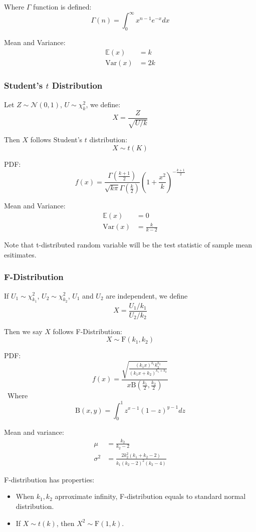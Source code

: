 Where $\Gamma$ function is defined:
\[
    \Gamma(n) = \int_0^\infty x^{n-1}e^{-x} dx
\]


Mean and Variance:
\[
\begin{aligned}
    \mathbb{E}(x) &= k \\
    \mathrm{Var}(x) &= 2k
\end{aligned}    
\]

\subsubsection{Student’s $t$ Distribution}
Let $Z \sim \mathcal{N}(0,1)$, $U \sim \chi_k^2$, we define:
\[
    X = \frac{Z}{\sqrt{U/k}}
\]

Then $X$ follows Student’s $t$ distribution:
\[
    X \sim t(K)
\]

PDF:
\[
    f(x) = \frac{\Gamma(\frac{k+1}{2})}{\sqrt{k\pi}\Gamma(\frac{k}{2})} (1+\frac{x^2}{k})^{-\frac{k+1}{2}}
\]

Mean and Variance:
\[
\begin{aligned}
    \mathbb{E}(x) &= 0 \\
    \mathrm{Var}(x) &= \frac{k}{k-2}
\end{aligned}    
\]

Note that t-distributed random variable will be the test statistic of sample mean esitimates.

\subsubsection{F-Distribution}
If $U_1 \sim \chi_{k_1}^2$, $U_2 \sim \chi_{k_2}^2$, $U_1$ and $U_2$ are independent, we define
\[
    X = \frac{U_1/k_1}{U_2/k_2}
\]

Then we say $X$ follows F-Distribution:
\[
    X \sim \mathrm{F}(k_1,k_2)
\]

PDF:
\[
    f(x) = \frac{
        \sqrt{
            \frac{(k_1x)^{k_1}k_2^{k_2}}{(k_1x+k_2)^{k_1+k_2}}
        }
    }{x \mathrm{B}(\frac{k_1}{2},\frac{k_2}{2})}
\]\
Where
\[
    \mathrm{B}(x,y) = \int_0^1 z^{x-1}(1-z)^{y-1}dz
\]

Mean and variance:
\[
    \begin{aligned}
        \mu &= \frac{k_2}{k_2-2}\\
        \sigma^2 &= \frac{2k_2^2(k_1+k_2-2)}{k_1(k_2-2)^2(k_2-4)}
    \end{aligned}
\]

F-distribution has properties:
\begin{itemize}
    \item When $k_1,k_2$ aprroximate infinity, F-distribution equals to standard normal distribution.
    \item If $X\sim t(k)$, then $X^2 \sim \mathrm{F}(1,k)$.
\end{itemize}